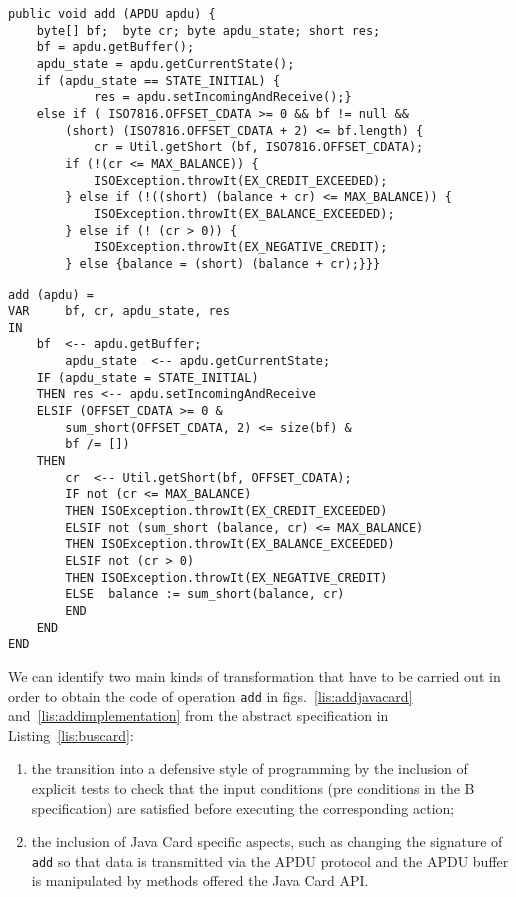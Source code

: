 \documentclass{llncs}
\begin{document}
\begin{lstlisting}
public void add (APDU apdu) { 
	byte[] bf;  byte cr; byte apdu_state; short res;			
	bf = apdu.getBuffer();
	apdu_state = apdu.getCurrentState();
	if (apdu_state == STATE_INITIAL) { 
			res = apdu.setIncomingAndReceive();} 
	else if ( ISO7816.OFFSET_CDATA >= 0 && bf != null &&
		(short) (ISO7816.OFFSET_CDATA + 2) <= bf.length) {
			cr = Util.getShort (bf, ISO7816.OFFSET_CDATA);
		if (!(cr <= MAX_BALANCE)) {	
			ISOException.throwIt(EX_CREDIT_EXCEEDED);
		} else if (!((short) (balance + cr) <= MAX_BALANCE)) {
			ISOException.throwIt(EX_BALANCE_EXCEEDED);
		} else if (! (cr > 0)) { 
			ISOException.throwIt(EX_NEGATIVE_CREDIT);
		} else {balance = (short) (balance + cr);}}}
\end{lstlisting}

\begin{lstlisting}
add (apdu) = 
VAR 	bf, cr, apdu_state, res
IN
	bf  <-- apdu.getBuffer;		
    	apdu_state  <-- apdu.getCurrentState;
	IF (apdu_state = STATE_INITIAL) 
	THEN res <-- apdu.setIncomingAndReceive                
	ELSIF (OFFSET_CDATA >= 0 &
		sum_short(OFFSET_CDATA, 2) <= size(bf) & 
		bf /= [])
	THEN 
		cr  <-- Util.getShort(bf, OFFSET_CDATA);
		IF not (cr <= MAX_BALANCE)
		THEN ISOException.throwIt(EX_CREDIT_EXCEEDED)
		ELSIF not (sum_short (balance, cr) <= MAX_BALANCE)
		THEN ISOException.throwIt(EX_BALANCE_EXCEEDED)
		ELSIF not (cr > 0)
		THEN ISOException.throwIt(EX_NEGATIVE_CREDIT) 
		ELSE  balance := sum_short(balance, cr)
		END
	END
END
\end{lstlisting}


We can identify two main kinds of transformation that have to be
carried out in order to obtain the code of operation \texttt{add} in
figs.~\ref{lis:addjavacard} and~\ref{lis:addimplementation} from the
abstract specification in Listing~\ref{lis:buscard}:

\begin{enumerate}
\item the transition into a defensive style of programming by the
  inclusion of explicit tests to check that the input conditions (pre
  conditions in the B specification) are satisfied before executing
  the corresponding action;

\item the inclusion of Java Card specific aspects, such as changing
  the signature of \texttt{add} so that data is transmitted via the
  APDU protocol and the APDU buffer is manipulated by methods offered
  the Java Card API.

\end{enumerate}
\end{document}
